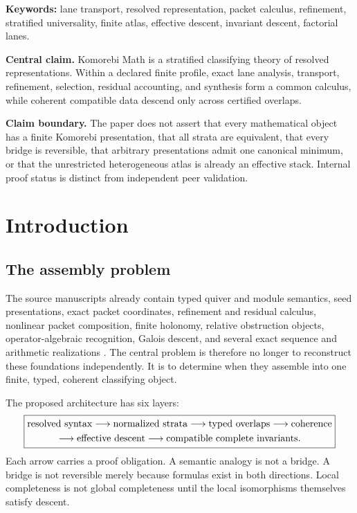 \documentclass[11pt]{article}
\theoremstyle{definition}
\theoremstyle{remark}
\begin{document}
\begin{center}
\small\textbf{Keywords:} lane transport, resolved representation, packet calculus, refinement, stratified universality, finite atlas, effective descent, invariant descent, factorial lanes.
\end{center}

\begin{claimbox}
\textbf{Central claim.}
Komorebi Math is a stratified classifying theory of resolved representations. Within a declared finite profile, exact lane analysis, transport, refinement, selection, residual accounting, and synthesis form a common calculus, while coherent compatible data descend only across certified overlaps.
\end{claimbox}

\begin{boundarybox}
\textbf{Claim boundary.}
The paper does not assert that every mathematical object has a finite Komorebi presentation, that all strata are equivalent, that every bridge is reversible, that arbitrary presentations admit one canonical minimum, or that the unrestricted heterogeneous atlas is already an effective stack. Internal proof status is distinct from independent peer validation.
\end{boundarybox}

\tableofcontents
\clearpage
{}

\section{Introduction}

\subsection{The assembly problem}

The source manuscripts already contain typed quiver and module semantics, seed presentations, exact packet coordinates, refinement and residual calculus, nonlinear packet composition, finite holonomy, relative obstruction objects, operator-algebraic recognition, Galois descent, and several exact sequence and arithmetic realizations \cite{P1,RT,P3,GAL,SEQ}. The central problem is therefore no longer to reconstruct these foundations independently. It is to determine when they assemble into one finite, typed, coherent classifying object.

The proposed architecture has six layers:
\[
\boxed{
\begin{gathered}
\text{resolved syntax}\longrightarrow\text{normalized strata}
\longrightarrow\text{typed overlaps}\longrightarrow\text{coherence}\cr
\longrightarrow\text{effective descent}
\longrightarrow\text{compatible complete invariants}.
\end{gathered}}
\]
Each arrow carries a proof obligation. A semantic analogy is not a bridge. A bridge is not reversible merely because formulas exist in both directions. Local completeness is not global completeness until the local isomorphisms themselves satisfy descent.
\end{document}
